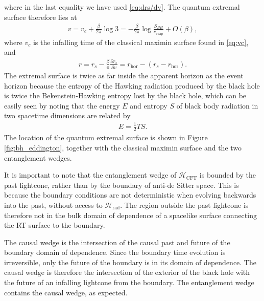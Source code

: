 \documentclass[12pt]{article}
\begin{document}
where in the last equality we have used \eqref{eq:drs/dv}. The quantum extremal surface therefore lies at 
\begin{align} \label{eq:vq}
v = v_c + \frac{\beta}{2\pi} \log 3 = - \frac{\beta}{2 \pi} \log \frac{S_{BH}}{c_\text{evap}} + O(\beta),
\end{align}
where $v_c$ is the infalling time of the classical maximin surface found in \eqref{eq:vc}, and
\begin{align} \label{eq:rq}
r = r_s - \frac{\beta}{\pi} \frac{\partial r_s}{\partial v} = r_\text{hor} - (r_s - r_\text{hor}).
\end{align}
The extremal surface is twice as far inside the apparent horizon as the event horizon because the entropy of the Hawking radiation produced by the black hole is twice the Bekenstein-Hawking entropy lost by the black hole, which can be easily seen by noting that the energy $E$ and entropy $S$ of black body radiation in two spacetime dimensions are related by 
\begin{align}
E = \frac{1}{2} T S.
\end{align}
The location of the quantum extremal surface is shown in Figure \ref{fig:bh_eddington}, together with the classical maximin surface and the two entanglement wedges. 

It is important to note that the entanglement wedge of $\mathcal{H}_\text{CFT}$ is bounded by the past lightcone, rather than by the boundary of anti-de Sitter space. This is because the boundary conditions are not deterministic when evolving backwards into the past, without access to $\mathcal{H}_\text{rad}$. The region outside the past lightcone is therefore not in the bulk domain of dependence of a spacelike surface connecting the RT surface to the boundary.

The causal wedge is the intersection of the causal past and future of the boundary domain of dependence. Since the boundary time evolution is irreversible, only the future of the boundary is in its domain of dependence. The causal wedge is therefore the intersection of the exterior of the black hole with the future of an infalling lightcone from the boundary. The entanglement wedge contains the causal wedge, as expected.
\end{document}
